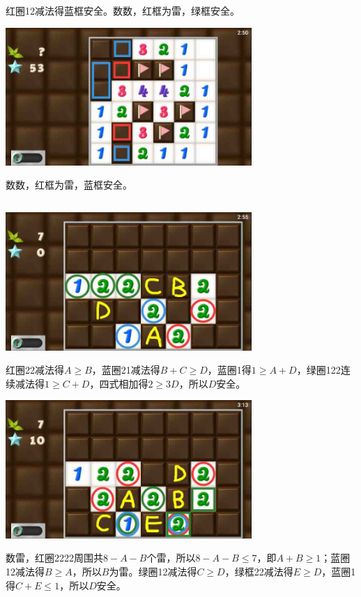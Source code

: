红圈12减法得蓝框安全。数数，红框为雷，绿框安全。
\begin{center}
    \includegraphics[width=0.7\textwidth]{puzzlelow/231-5.jpg}
\end{center}
数数，红框为雷，蓝框安全。

\subsection{} %
\begin{center}
    \includegraphics[width=0.7\textwidth]{puzzlelow/232-1.jpg}
\end{center}
红圈22减法得$A\ge B$，蓝圈21减法得$B+C\ge D$，蓝圈1得$1\ge A+D$，绿圈122连续减法得$1\ge C+D$，四式相加得$2\ge 3D$，所以$D$安全。
\begin{center}
    \includegraphics[width=0.7\textwidth]{puzzlelow/232-2.jpg}
\end{center}
数雷，红圈2222周围共$8-A-B$个雷，所以$8-A-B\le 7$，即$A+B\ge 1$；蓝圈12减法得$B\ge A$，所以$B$为雷。绿圈12减法得$C\ge D$，绿框22减法得$E\ge D$，蓝圈1得$C+E\le 1$，所以$D$安全。
